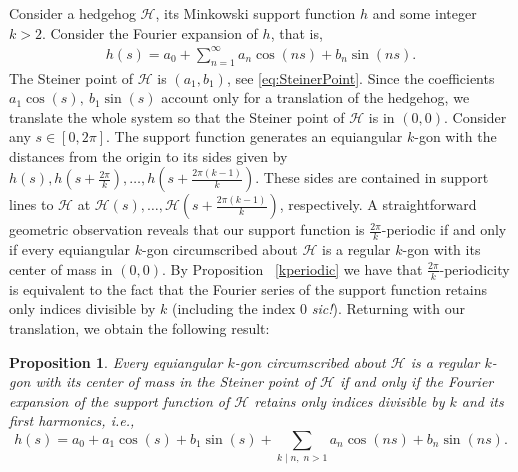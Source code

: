 \documentclass{amsart}
\newtheorem{prop}[thm]{Proposition}
\theoremstyle{definition}
\numberwithin{equation}{section}
\begin{document}
\noindent Consider a hedgehog $\mathcal{H}$, its Minkowski support function $h$ and some integer $k>2$. Consider the Fourier expansion of $h$, that is, 
\begin{align*}
h (s) = a_0 + \sum_{ n=1}^{\infty}a_n\cos(ns)+b_n\sin(ns).
\end{align*}
The Steiner point of $\mathcal{H}$ is $(a_1, b_1)$, see \eqref{eq:SteinerPoint}. Since the coefficients $a_1\cos(s),\ b_1\sin(s)$ account only for a translation of the hedgehog, we translate the whole system so that the Steiner point of $\mathcal{H}$ is in $(0,0)$.
Consider any $s\in[0,2\pi]$. The support function generates an equiangular $k$-gon with the distances from the origin to its sides given by $h(s),h\left(s+\frac{2\pi}{k}\right),\ldots , h\left(s+\frac{2\pi(k-1)}{k}\right)$. These sides are contained in support lines to $\mathcal{H}$ at $\mathcal{H}(s),\ldots,\mathcal{H}\left(s+\frac{2\pi(k-1)} {k}\right)$, respectively. A straightforward geometric observation reveals that our support function is $\frac{2\pi}{k}$-periodic if and only if every equiangular $k$-gon circumscribed about $\mathcal{H}$ is a regular $k$-gon with its center of mass in $(0,0)$. By Proposition ~\ref{kperiodic} we have that $\frac{2\pi}{k}$-periodicity is equivalent to the fact that the Fourier series of the support function retains only indices divisible by $k$ (including the index $0$ \textit{sic!}). Returning with our translation, we obtain the following result:
\begin{prop}\label{regularequiv}
    Every equiangular $k$-gon circumscribed about $\mathcal{H}$ is a regular \linebreak $k$-gon with its center of mass in the Steiner point of $\mathcal{H}$ if and only if the Fourier expansion of the support function of $\mathcal{H}$ retains only indices divisible by $k$ and its first harmonics, i.e.,
    $$h(s) = a_0 +a_1\cos(s)+b_1\sin(s)+ \sum_{k\mid n, \;n>1}a_n\cos(ns)+b_n\sin(ns).$$
\end{prop}
\end{document}
